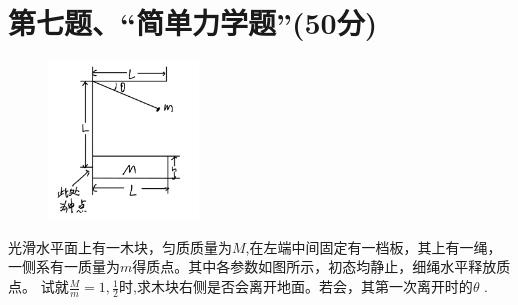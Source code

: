\documentclass{article}
\begin{document}
\section*{第七题、“简单力学题”(50分)}
\begin{figure}
	\vspace{-15pt}    %
	\includegraphics[width=4cm]{img/7.1.jpeg}\\
	\vspace{-15pt}    %
	\vspace{-15pt}    %
\end{figure}
光滑水平面上有一木块，匀质质量为$M$,在左端中间固定有一档板，其上有一绳，一侧系有一质量为$m$得质点。其中各参数如图所示，初态均静止，细绳水平释放质点。
试就$\frac{M}{m}=1,\frac{1}{2}$时,求木块右侧是否会离开地面。若会，其第一次离开时的$\theta$ .
\end{document}
